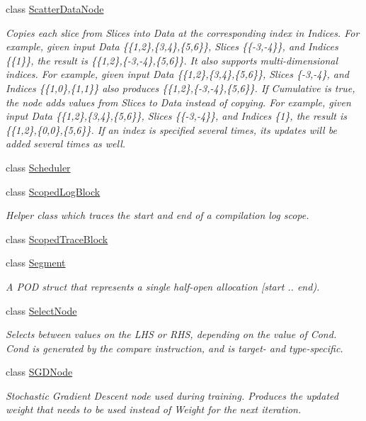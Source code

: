 \begin{DoxyCompactItemize}
\item 
class \hyperlink{classglow_1_1_scatter_data_node}{Scatter\+Data\+Node}
\begin{DoxyCompactList}\small\item\em Copies each slice from Slices into Data at the corresponding index in Indices. For example, given input Data \{\{1,2\},\{3,4\},\{5,6\}\}, Slices \{\{-\/3,-\/4\}\}, and Indices \{\{1\}\}, the result is \{\{1,2\},\{-\/3,-\/4\},\{5,6\}\}. It also supports multi-\/dimensional indices. For example, given input Data \{\{1,2\},\{3,4\},\{5,6\}\}, Slices \{-\/3,-\/4\}, and Indices \{\{1,0\},\{1,1\}\} also produces \{\{1,2\},\{-\/3,-\/4\},\{5,6\}\}. If Cumulative is true, the node adds values from Slices to Data instead of copying. For example, given input Data \{\{1,2\},\{3,4\},\{5,6\}\}, Slices \{\{-\/3,-\/4\}\}, and Indices \{1\}, the result is \{\{1,2\},\{0,0\},\{5,6\}\}. If an index is specified several times, its updates will be added several times as well. \end{DoxyCompactList}\item 
class \hyperlink{classglow_1_1_scheduler}{Scheduler}
\item 
class \hyperlink{classglow_1_1_scoped_log_block}{Scoped\+Log\+Block}
\begin{DoxyCompactList}\small\item\em Helper class which traces the start and end of a compilation log scope. \end{DoxyCompactList}\item 
class \hyperlink{classglow_1_1_scoped_trace_block}{Scoped\+Trace\+Block}
\item 
class \hyperlink{classglow_1_1_segment}{Segment}
\begin{DoxyCompactList}\small\item\em A P\+OD struct that represents a single half-\/open allocation \mbox{[}start .. end). \end{DoxyCompactList}\item 
class \hyperlink{classglow_1_1_select_node}{Select\+Node}
\begin{DoxyCompactList}\small\item\em Selects between values on the L\+HS or R\+HS, depending on the value of Cond. Cond is generated by the compare instruction, and is target-\/ and type-\/specific. \end{DoxyCompactList}\item 
class \hyperlink{classglow_1_1_s_g_d_node}{S\+G\+D\+Node}
\begin{DoxyCompactList}\small\item\em Stochastic Gradient Descent node used during training. Produces the updated weight that needs to be used instead of Weight for the next iteration. \end{DoxyCompactList}\item 

\end{DoxyCompactItemize}
